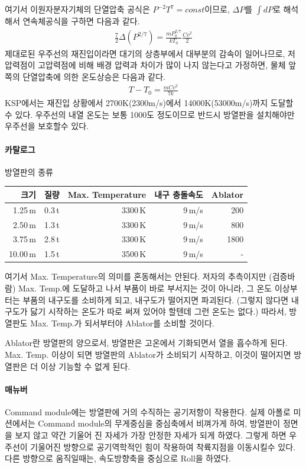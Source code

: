\documentclass[9pt,twoside,openany]{amsbook}
\begin{document}
여기서 이원자분자기체의 단열압축 공식은 $P^{-2}T^7=const$이므로, $\Delta P$를 $\int dP$로 해석해서 연속체공식을 구하면 다음과 같다.
\begin{align}
	\frac{7}{2}\Delta(P^{2/7}) = \frac{mP_0^{2/7}}{kT_0} \frac{Cv^2}{2}
\end{align}
제대로된 우주선의 재진입이라면 대기의 상층부에서 대부분의 감속이 일어나므로, 저압력점이 고압력점에 비해 배경 압력과 차이가 많이 나지 않는다고 가정하면, 물체 앞쪽의 단열압축에 의한 온도상승은 다음과 같다.
\begin{align}
T-T_0 = \frac{mCv^2}{7k}
\end{align}
KSP에서는 재진입 상황에서 2700K(2300m/s)에서 14000K(53000m/s)까지 도달할 수 있다. 우주선의 내열 온도는 보통 1000도 정도이므로 반드시 방열판을 설치해야만 우주선을 보호할수 있다.

\paragraph{카탈로그}
\par
\begin{threeparttable}
\caption{방열판의 종류}
\begin{tabular}{|r|r|r|r|r|}
\hline
크기&질량& Max. Temperature& 내구 충돌속도& Ablator
\\\hline
1.25\,m&0.3\,t& 3300\,K&9\,m/s&200
\\2.50\,m&1.3\,t&3300\,K&9\,m/s&800
\\3.75\,m&2.8\,t&3300\,K&9\,m/s&1800
\\10.00\,m&1.5\,t&3500\,K&9\,m/s&-
\\\hline
\end{tabular}
\end{threeparttable}

여기서 Max. Temperature의 의미를 혼동해서는 안된다. 저자의 추측이지만 (검증바람) Max. Temp.에 도달하고 나서 부품이 바로 부서지는 것이 아니라, 그 온도 이상부터는 부품의 내구도를 소비하게 되고, 내구도가 떨어지면 파괴된다. (그렇지 않다면 내구도가 닳기 시작하는 온도가 따로 써져 있어야 할텐데 그런 온도는 없다.) 따라서, 방열판도 Max. Temp.가 되서부터야 Ablator를 소비할 것이다.

Ablator란 방열판의 양으로서, 방열판은 고온에서 기화되면서 열을 흡수하게 된다. Max. Temp. 이상이 되면 방열판의 Ablator가 소비되기 시작하고, 이것이 떨어지면 방열판은 더 이상 기능할 수 없게 된다.
\paragraph{매뉴버}
Command module에는 방열판에 거의 수직하는 공기저항이 작용한다. 실제 아폴로 미션에서는 Command module의 무게중심을 중심축에서 비껴가게 하여, 방열판이 정면을 보지 않고 약간 기울어 진 자세가 가장 안정한 자세가 되게 하였다. 그렇게 하면 우주선이 기울어진 방향으로 공기역학적인 힘이 작용하여 착륙지점을 이동시킬수 있다. 다른 방향으로 움직일때는, 속도방향축을 중심으로 Roll을 하였다.
\end{document}
